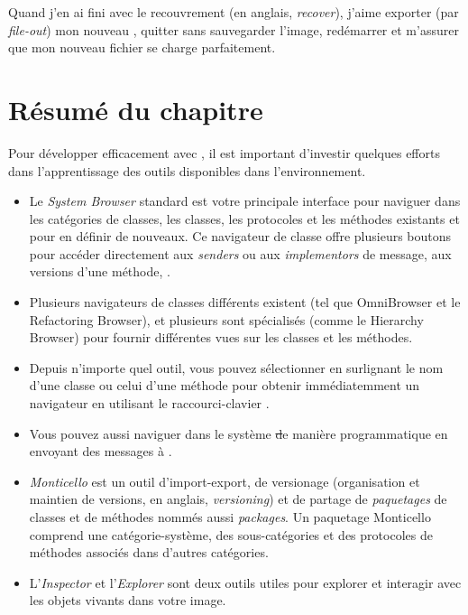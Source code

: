 \documentclass[a4paper,10pt,twoside]{book}
\begin{document}
Quand j'en ai fini avec le recouvrement (en anglais, \emph{recover}), 
j'aime exporter (par \emph{file-out}) mon nouveau \changeset, quitter \sq
sans sauvegarder l'image, red\'emarrer et m'assurer que mon nouveau fichier
se charge parfaitement.

\section{R\'esum\'e du chapitre}

Pour d\'evelopper efficacement avec \sq, il est
important d'investir quelques efforts dans l'apprentissage des outils
disponibles dans l'environnement.

\begin{itemize}
  \item Le \emph{System Browser} standard est votre principale interface pour naviguer dans les cat\'egories de classes, les classes, les protocoles et les m\'ethodes existants et pour en d\'efinir de nouveaux.
Ce navigateur de classe offre plusieurs boutons pour acc\'eder directement aux \emph{senders} ou aux \emph{implementors} de message, aux versions d'une m\'ethode, 
\etc.
  \item Plusieurs navigateurs de classes diff\'erents existent
(tel que OmniBrowser et le Refactoring Browser), et plusieurs sont sp\'ecialis\'es (comme le Hierarchy Browser) pour fournir diff\'erentes vues sur les classes et les m\'ethodes.
  \item Depuis n'importe quel outil, vous pouvez s\'electionner en surlignant le nom d'une classe ou celui d'une m\'ethode pour obtenir imm\'ediatemment
un navigateur en utilisant le raccourci-clavier .
  \item Vous pouvez aussi naviguer dans le syst\`eme \st de mani\`ere
programmatique en envoyant des messages \`a .
  \item \emph{Monticello} est un outil d'import-export, de versionage
    (organisation et maintien de versions, en anglais, \emph{versioning}) et de partage de \emph{paquetages} de classes et de m\'ethodes nomm\'es aussi \emph{packages}.
  Un paquetage Monticello comprend une cat\'egorie-syst\`eme, des sous-cat\'egories et des protocoles de m\'ethodes associ\'es dans d'autres cat\'egories. 
  \item L'\emph{Inspector} et l'\emph{Explorer} sont deux outils utiles
pour explorer et interagir avec les objets vivants dans votre image.

\end{itemize}
\end{document}
